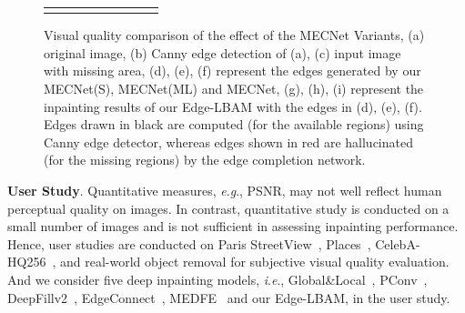 \documentclass[10pt,journal,compsoc]{IEEEtran}
\newcommand{\ie}{\textit{i}.\textit{e}.}
\newcommand{\eg}{\textit{e}.\textit{g}.}
\begin{document}
\begin{figure}[hbt]
\begin{tabular}{ccccccccc}
		\vspace{-2mm}
	\end{tabular}
	\caption{Visual quality comparison of the effect of the MECNet Variants, (a) original image, (b) Canny edge detection of (a), (c) input image with missing area, (d), (e), (f) represent the edges generated by our MECNet(S), MECNet(ML) and MECNet, (g), (h), (i) represent the inpainting results of our Edge-LBAM with the edges in (d), (e), (f). Edges drawn in black are computed (for the available regions) using Canny edge detector, whereas edges shown in red are hallucinated (for the missing regions) by the edge completion network.}
	\label{fig:single-vs-multi}
\end{figure}

{\textbf{User Study}.} Quantitative measures, \eg, PSNR, may not well reflect human perceptual quality on images.
%
In contrast, quantitative study is conducted on a small number of images and is not sufficient in assessing inpainting performance.
%
Hence, user studies are conducted on Paris StreetView~\cite{doersch2015makes}, Places~\cite{zhou2017places}, CelebA-HQ256~\cite{karras2017progressive}, and real-world object removal for subjective visual quality evaluation.
%
And we consider five deep inpainting models, \ie, Global\&Local~\cite{IizukaGL}, PConv~\cite{partialconv2017}, DeepFillv2~\cite{yu2018free}, EdgeConnect~\cite{nazeri2019edgeconnect}, {MEDFE~\cite{liu2020rethinking}} and our Edge-LBAM, in the user study.


\end{document}
